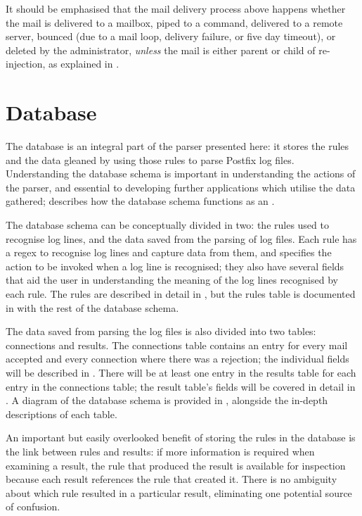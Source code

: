 It should be emphasised that the mail delivery process above happens
whether the mail is delivered to a mailbox, piped to a command, delivered
to a remote server, bounced (due to a mail loop, delivery failure, or five
day timeout), or deleted by the administrator, \textit{unless\/} the mail
is either parent or child of re-injection, as explained in
.

\section{Database}

\label{database}

The database is an integral part of the parser presented here: it stores
the rules and the data gleaned by using those rules to parse Postfix log
files.  Understanding the database schema is important in understanding the
actions of the parser, and essential to developing further applications
which utilise the data gathered;  describes
how the database schema functions as an .

The database schema can be conceptually divided in two: the rules used to
recognise log lines, and the data saved from the parsing of log files.
Each rule has a regex to recognise log lines and capture data from them,
and specifies the action to be invoked when a log line is recognised; they
also have several fields that aid the user in understanding the meaning of
the log lines recognised by each rule.  The rules are described in detail
in , but the rules table is documented
in  with the rest of the database schema.

The data saved from parsing the log files is also divided into two tables:
connections and results.  The connections table contains an entry for every
mail accepted and every connection where there was a rejection; the
individual fields will be described in .
There will be at least one entry in the results table for each entry in the
connections table; the result table's fields will be covered in detail in
.  A diagram of the database schema is provided
in , alongside the
in-depth descriptions of each table.

An important but easily overlooked benefit of storing the rules in the
database is the link between rules and results: if more information is
required when examining a result, the rule that produced the result is
available for inspection because each result references the rule that
created it.  There is no ambiguity about which rule resulted in a
particular result, eliminating one potential source of confusion.

